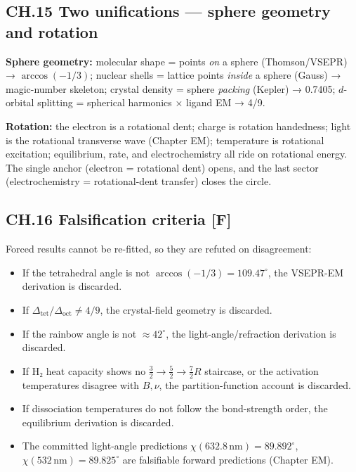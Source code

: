 \documentclass[
  10pt,
]{article}
\providecommand{\tightlist}{%
  \setlength{\itemsep}{0pt}\setlength{\parskip}{0pt}}
\begin{document}
\hypertarget{ch.15-two-unifications-sphere-geometry-and-rotation}{%
\subsection{CH.15 Two unifications --- sphere geometry and
rotation}\label{ch.15-two-unifications-sphere-geometry-and-rotation}}

\textbf{Sphere geometry:} molecular shape = points \emph{on} a sphere
(Thomson/VSEPR) → \(\arccos(-1/3)\); nuclear shells = lattice points
\emph{inside} a sphere (Gauss) → magic-number skeleton; crystal density
= sphere \emph{packing} (Kepler) → 0.7405; \(d\)-orbital splitting =
spherical harmonics × ligand EM → 4/9.

\textbf{Rotation:} the electron is a rotational dent; charge is rotation
handedness; light is the rotational transverse wave (Chapter EM);
temperature is rotational excitation; equilibrium, rate, and
electrochemistry all ride on rotational energy. The single anchor
(electron = rotational dent) opens, and the last sector
(electrochemistry = rotational-dent transfer) closes the circle.

\hypertarget{ch.16-falsification-criteria-f}{%
\subsection{\texorpdfstring{CH.16 Falsification criteria
\textbf{{[}F{]}}}{CH.16 Falsification criteria {[}F{]}}}\label{ch.16-falsification-criteria-f}}

Forced results cannot be re-fitted, so they are refuted on disagreement:

\begin{itemize}
\tightlist
\item
  If the tetrahedral angle is not \(\arccos(-1/3)=109.47^\circ\), the
  VSEPR-EM derivation is discarded.
\item
  If \(\Delta_{\text{tet}}/\Delta_{\text{oct}} \neq 4/9\), the
  crystal-field geometry is discarded.
\item
  If the rainbow angle is not \(\approx 42^\circ\), the
  light-angle/refraction derivation is discarded.
\item
  If H₂ heat capacity shows no \(\tfrac32\to\tfrac52\to\tfrac72 R\)
  staircase, or the activation temperatures disagree with \(B,\nu\), the
  partition-function account is discarded.
\item
  If dissociation temperatures do not follow the bond-strength order,
  the equilibrium derivation is discarded.
\item
  The committed light-angle predictions
  \(\chi(632.8\,\text{nm})=89.892^\circ\),
  \(\chi(532\,\text{nm})=89.825^\circ\) are falsifiable forward
  predictions (Chapter EM).
\end{itemize}
\end{document}
